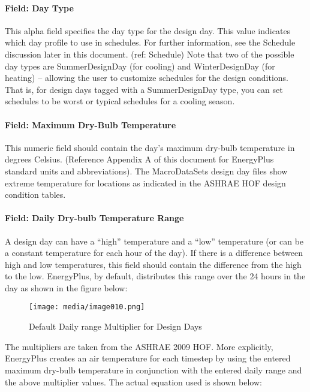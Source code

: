 \paragraph{Field: Day Type}\label{field-day-type}

This alpha field specifies the day type for the design day. This value indicates which day profile to use in schedules. For further information, see the Schedule discussion later in this document. (ref: Schedule) Note that two of the possible day types are SummerDesignDay (for cooling) and WinterDesignDay (for heating) -- allowing the user to customize schedules for the design conditions. That is, for design days tagged with a SummerDesignDay type, you can set schedules to be worst or typical schedules for a cooling season.

\paragraph{Field: Maximum Dry-Bulb Temperature}\label{field-maximum-dry-bulb-temperature}

This numeric field should contain the day's maximum dry-bulb temperature in degrees Celsius. (Reference Appendix A of this document for EnergyPlus standard units and abbreviations). The MacroDataSets design day files show extreme temperature for locations as indicated in the ASHRAE HOF design condition tables.

\paragraph{Field: Daily Dry-bulb Temperature Range}\label{field-daily-dry-bulb-temperature-range}

A design day can have a ``high'' temperature and a ``low'' temperature (or can be a constant temperature for each hour of the day). If there is a difference between high and low temperatures, this field should contain the difference from the high to the low. EnergyPlus, by default, distributes this range over the 24 hours in the day as shown in the figure below:

\begin{figure}[hbtp] %
\centering
\texttt{[image: media/image010.png]}
\caption{Default Daily range Multiplier for Design Days \protect \label{fig:default-daily-range-multiplier-for-design}}
\end{figure}

The multipliers are taken from the ASHRAE 2009 HOF. More explicitly, EnergyPlus creates an air temperature for each timestep by using the entered maximum dry-bulb temperature in conjunction with the entered daily range and the above multiplier values. The actual equation used is shown below:

